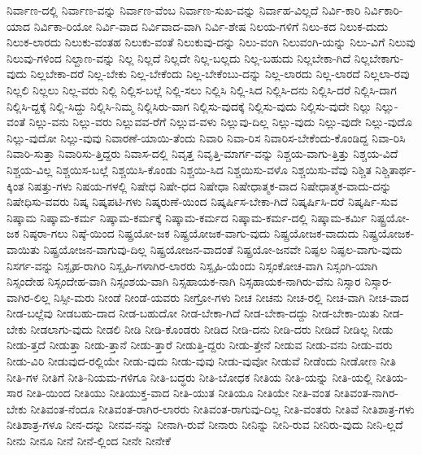 {ನಿರ್ವಾಣ-ದಲ್ಲಿ
ನಿರ್ವಾಣ-ವನ್ನು
ನಿರ್ವಾಣ-ವೆಂಬ
ನಿರ್ವಾಣ-ಸುಖ-ವನ್ನು
ನಿರ್ವಾಹ-ವಿಲ್ಲದೆ
ನಿರ್ವಿ-ಕಾರಿ
ನಿರ್ವಿಕಾರಿ-ಯಾದ
ನಿರ್ವಿಕಾ-ರಿಯೋ
ನಿರ್ವಿ-ವಾದ
ನಿರ್ವಿವಾದ-ವಾಗಿ
ನಿರ್ವಿ-ಶೇಷ
ನಿಲಯ-ಗಳಿಗೆ
ನಿಲು-ಕದ
ನಿಲುಕ-ದುದು
ನಿಲುಕ-ಲಾರದು
ನಿಲುಕು-ವಂತಹ
ನಿಲುಕು-ವಂತೆ
ನಿಲುಕುವು-ದನ್ನು
ನಿಲು-ವಂಗಿ
ನಿಲುವಂಗಿ-ಯನ್ನು
ನಿಲು-ವಿಗೆ
ನಿಲುವು
ನಿಲುವು-ಗಳಿಂದ
ನಿಲ್ದಾಣ-ವನ್ನು
ನಿಲ್ಲ
ನಿಲ್ಲದೆ
ನಿಲ್ಲದೇ
ನಿಲ್ಲ-ಬಲ್ಲದು
ನಿಲ್ಲ-ಬಹುದು
ನಿಲ್ಲಬೇಕಾ-ಗಿದೆ
ನಿಲ್ಲಬೇಕಾಗು-ವುದು
ನಿಲ್ಲಬೇಕಾ-ದರೆ
ನಿಲ್ಲ-ಬೇಕು
ನಿಲ್ಲ-ಬೇಕೆಂದು
ನಿಲ್ಲ-ಬೇಕೆಂಬು-ದನ್ನು
ನಿಲ್ಲ-ಲಾರದು
ನಿಲ್ಲ-ಲಾರದೆ
ನಿಲ್ಲಲಾ-ರವು
ನಿಲ್ಲಲಿ
ನಿಲ್ಲಲು
ನಿಲ್ಲ-ವರು
ನಿಲ್ಲಿ
ನಿಲ್ಲಿಸ-ಬಲ್ಲೆ
ನಿಲ್ಲಿ-ಸಲು
ನಿಲ್ಲಿಸಿ
ನಿಲ್ಲಿ-ಸಿದ
ನಿಲ್ಲಿಸಿ-ದನು
ನಿಲ್ಲಿಸಿ-ದರೆ
ನಿಲ್ಲಿಸಿ-ದಾಗ
ನಿಲ್ಲಿಸಿ-ದ್ದಕ್ಕೆ
ನಿಲ್ಲಿ-ಸಿದ್ದು
ನಿಲ್ಲಿಸಿ-ನಿಮ್ಮ
ನಿಲ್ಲಿಸಿರು-ವಾಗ
ನಿಲ್ಲಿಸು-ವುದಕ್ಕೆ
ನಿಲ್ಲಿಸು-ವುದು
ನಿಲ್ಲಿಸು-ವುದೇ
ನಿಲ್ಲು
ನಿಲ್ಲು-ವಂತೆ
ನಿಲ್ಲು-ವನು
ನಿಲ್ಲು-ವರು
ನಿಲ್ಲುವವ-ರೆಗೆ
ನಿಲ್ಲುವ-ವಳು
ನಿಲ್ಲುವು-ದಿಲ್ಲ
ನಿಲ್ಲು-ವುದು
ನಿಲ್ಲು-ವುದೇ
ನಿಲ್ಲು-ವುದೊ
ನಿಲ್ಲು-ವುದೋ
ನಿಲ್ಲು-ವುವು
ನಿವಾರಣೆ-ಯಾಯಿ-ತೆಂದು
ನಿವಾರಿ
ನಿವಾ-ರಿಸ
ನಿವಾರಿಸ-ಬೇಕೆಂದು-ಕೊಂಡಿದ್ದ
ನಿವಾ-ರಿಸಿ
ನಿವಾರಿ-ಸುತ್ತಾ
ನಿವಾರಿಸು-ತ್ತಿದ್ದರು
ನಿವಾಸ-ದಲ್ಲಿ
ನಿವೃತ್ತ
ನಿವೃತ್ತಿ-ಮಾರ್ಗ-ವನ್ನು
ನಿಶ್ಚಯ-ವಾಗು-ತ್ತಿತ್ತು
ನಿಶ್ಚಯ-ವಿದೆ
ನಿಶ್ಚಯ-ವಿಲ್ಲ
ನಿಶ್ಚಯಿಸ-ಬಲ್ಲೆ
ನಿಶ್ಚಯಿಸಿ-ಕೊಂಡು
ನಿಶ್ಚಯಿ-ಸಿದ
ನಿಶ್ಚಯಿಸು-ವಳೊ
ನಿಶ್ಚಯಿಸು-ವೆವು
ನಿಶ್ಚಿತ
ನಿಶ್ಚಿತಾರ್ಥ-ಕ್ಕಿಂತ
ನಿಷತ್ತು-ಗಳು
ನಿಷಯ-ಗಳಲ್ಲಿ
ನಿಷೇಧ
ನಿಷೇ-ಧದ
ನಿಷೇಧಾ
ನಿಷೇಧಾತ್ಮಕ-ವಾದ
ನಿಷೇಧಾತ್ಮಕ-ವಾದು-ದನ್ನು
ನಿಷೇಧಿಸು-ವವರು
ನಿಷ್ಕ
ನಿಷ್ಕಪಟಿ-ಗಳು
ನಿಷ್ಕರುಣೆ-ಯಿಂದ
ನಿಷ್ಕರ್ಷಿಸ-ಬೇಕಾ-ಗಿದೆ
ನಿಷ್ಕರ್ಷಿಸಿ-ದರೆ
ನಿಷ್ಕರ್ಷಿ-ಸುವ
ನಿಷ್ಕಾಮ
ನಿಷ್ಕಾಮ-ಕರ್ಮ
ನಿಷ್ಕಾಮ-ಕರ್ಮಕ್ಕೆ
ನಿಷ್ಕಾಮ-ಕರ್ಮದ
ನಿಷ್ಕಾಮ-ಕರ್ಮ-ದಲ್ಲಿ
ನಿಷ್ಕಾಮ-ಕರ್ಮಿ
ನಿಷ್ಟ್ರಯೋ-ಜಕ
ನಿಷ್ಠರಾ-ಗಲು
ನಿಷ್ಠೆ-ಯಿಂದ
ನಿಷ್ಪ್ರಯೋ-ಜಕ
ನಿಷ್ಪ್ರಯೋಜಕ-ವಾಗು-ವುದು
ನಿಷ್ಪ್ರಯೋಜಕ-ವಾದುದು
ನಿಷ್ಪ್ರಯೋಜಕ-ವಾಯಿತು
ನಿಷ್ಪ್ರಯೋಜನ-ವಾಗುವು-ದಿಲ್ಲ
ನಿಷ್ಪ್ರಯೋಜನ-ವಾದಂತೆ
ನಿಷ್ಪ್ರಯೋ-ಜನವೇ
ನಿಷ್ಫಲ
ನಿಷ್ಫಲ-ವಾಗು-ವುದು
ನಿಸರ್ಗ-ವನ್ನು
ನಿಸ್ಪೃಹ-ರಾಗಿರಿ
ನಿಸ್ಪೃಹಿ-ಗಳಾಗಿರ-ಲಾರರು
ನಿಸ್ಪೃಹಿ-ಯೆಂದು
ನಿಸ್ಸಂಕೋಚ-ವಾಗಿ
ನಿಸ್ಸಂಗಿ-ಯಾಗಿ
ನಿಸ್ಸಂದೇಹ
ನಿಸ್ಸಂದೇಹ-ವಾಗಿ
ನಿಸ್ಸಂಶಯ-ವಾಗಿ
ನಿಸ್ಸಹಾಯಕ-ನಾಗಿ
ನಿಸ್ಸಹಾಯಕ-ನಾಗಿರು-ವೆನು
ನಿಸ್ಸಾರ
ನಿಸ್ಸಾರ-ವಾಗಿರ-ಲಿಲ್ಲ
ನಿಸ್ಸೀ-ಮರು
ನೀಂಡೆ
ನೀಂಡೆ-ಯವರು
ನೀಗ್ರೋ-ಗಳು
ನೀಚ
ನೀಚನು
ನೀಚ-ರಲ್ಲಿ
ನೀಚ-ವಾಗಿ
ನೀಚ-ವಾದ
ನೀಡ-ಬಲ್ಲೆವು
ನೀಡಬಹು-ದಾದ
ನೀಡ-ಬಹುದೋ
ನೀಡ-ಬೇಕಾ-ಗಿದೆ
ನೀಡ-ಬೇಕಾ-ದದ್ದು
ನೀಡ-ಬೇಕಾ-ಯಿತು
ನೀಡ-ಬೇಕು
ನೀಡಲಾಗು-ವುದು
ನೀಡಲಿ
ನೀಡಿ
ನೀಡಿ-ಕೊಂಡರು
ನೀಡಿದ
ನೀಡಿ-ದನು
ನೀಡಿ-ದರು
ನೀಡಿದೆ
ನೀಡಿಲ್ಲ
ನೀಡು
ನೀಡು-ತ್ತದೆ
ನೀಡುತ್ತಾ
ನೀಡು-ತ್ತಾನೆ
ನೀಡು-ತ್ತಾರೆ
ನೀಡುತ್ತಿ-ದ್ದರು
ನೀಡು-ತ್ತೇನೆ
ನೀಡುವ
ನೀಡು-ವನು
ನೀಡು-ವರು
ನೀಡು-ವಿರಿ
ನೀಡುವುದ-ರಲ್ಲಿಯೇ
ನೀಡು-ವುದು
ನೀಡು-ವುವು
ನೀಡು-ವುವೋ
ನೀಡುವೆ
ನೀಡೆಂದು
ನೀಡೋಣ
ನೀತಿ
ನೀತಿ-ಗಳ
ನೀತಿಗೆ
ನೀತಿ-ನಿಯಮ-ಗಳಿಗೂ
ನೀತಿ-ಬದ್ಧರು
ನೀತಿ-ಬೋಧಕ
ನೀತಿಯ
ನೀತಿ-ಯನ್ನು
ನೀತಿ-ಯಲ್ಲಿ
ನೀತಿಯ-ಸಾರ
ನೀತಿ-ಯಿಂದ
ನೀತಿಯು
ನೀತಿಯುಕ್ತ-ವಾದ
ನೀತಿ-ಯುತ
ನೀತಿಯೂ
ನೀತಿಯೇ
ನೀತಿ-ವಂತ
ನೀತಿವಂತ-ನಾಗಿರ-ಬೇಕು
ನೀತಿವಂತ-ನೆಂದೂ
ನೀತಿವಂತ-ರಾಗಿರ-ಲಾರರು
ನೀತಿವಂತ-ರಾಗುವು-ದಿಲ್ಲ
ನೀತಿ-ವಂತರು
ನೀತಿವೆ
ನೀತಿಶಾತ್ರ-ಗಳು
ನೀತಿಶಾತ್ರ-ಗಳೂ
ನೀನ-ದನ್ನು
ನೀನವ-ನನ್ನು
ನೀನಾಗಿ-ರುವೆ
ನೀನಾರು
ನೀನಿನ್ನು
ನೀನಿ-ರುವ
ನೀನಿರು-ವುದು
ನೀನಿ-ಲ್ಲದೆ
ನೀನು
ನೀನೂ
ನೀನೆ
ನೀನೆ-ಲ್ಲಿಂದ
ನೀನೇ
ನೀನೇಕೆ
}
